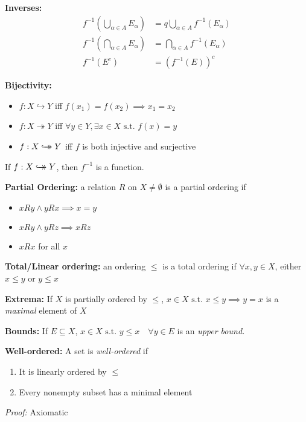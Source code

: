 \documentclass[12pt]{article}
\newcommand{\sub}{\subseteq}
\newcommand{\st}{\text{ s.t. }}
\newcommand{\surj}{\twoheadrightarrow}
\newcommand{\inj}{\hookrightarrow}
\newcommand{\biject}{\hookrightarrow \hspace{-8pt} \rightarrow}
\newenvironment*{tbox}[2][gray]{
    \begin{tcolorbox}[
        parbox=false,
        colback=#1!5!white,
        colframe=#1!75!black,
        breakable,
        title={#2}
    ]}
    {\end{tcolorbox}}
\begin{document}
    \textbf{Inverses:} 
    \begin{align*}
        f^{-1}\left(\bigcup_{\alpha \in A} E_{\alpha}\right) &= q\bigcup_{\alpha \in A} f^{-1}(E_{\alpha}) \\
        f^{-1}\left(\bigcap_{\alpha \in A} E_{\alpha}\right) &= \bigcap_{\alpha \in A} f^{-1}(E_{\alpha})\\ 
        f^{-1}(E^c) &= (f^{-1}(E))^c
    \end{align*}

    \textbf{Bijectivity:} 
    \begin{itemize}
        \item $f: X \inj Y$ iff $f(x_1) = f(x_2) \implies x_1 = x_2$ 
        \item $f: X \surj Y$ iff $\forall y \in Y, \exists x \in X \st f(x) = y$
        \item $f: X \biject Y$ iff $f$ is both injective and surjective
    \end{itemize}

    If $f: X \biject Y$, then $f^{-1}$ is a function. 

    \textbf{Partial Ordering:} a relation $R$ on $X \neq \emptyset$ is a partial ordering if 
    \begin{itemize}
        \item $xRy \land yRx \implies x = y$ 
        \item $xRy \land yRz \implies xRz$
        \item $xRx$ for all $x$
    \end{itemize}

    \textbf{Total/Linear ordering:} an ordering $\leq$ is a total ordering if $\forall x, y \in X$, either $x \leq y$ or $y \leq x$

    \textbf{Extrema:} If $X$ is partially ordered by $\leq$, $x \in X \st x\leq y \implies y = x$ is a \emph{maximal} element of $X$ 

    \textbf{Bounds:} If $E \sub X$, $x \in X \st y \leq x \quad \forall y \in E$ is an \emph{upper bound.}

    \textbf{Well-ordered:} A set is \emph{well-ordered} if  
    \begin{enumerate}
        \item It is linearly ordered by $\leq$ 
        \item Every nonempty subset has a minimal element
    \end{enumerate}

    \begin{tbox}{\textbf{Zorn's Lemma:} If $X$ is partially ordered by $\leq$ and every linearly ordered subset of $X$ has an upperbound, then $X$ has a maximal element.}
        \emph{Proof:} Axiomatic
    \end{tbox}
\end{document}
